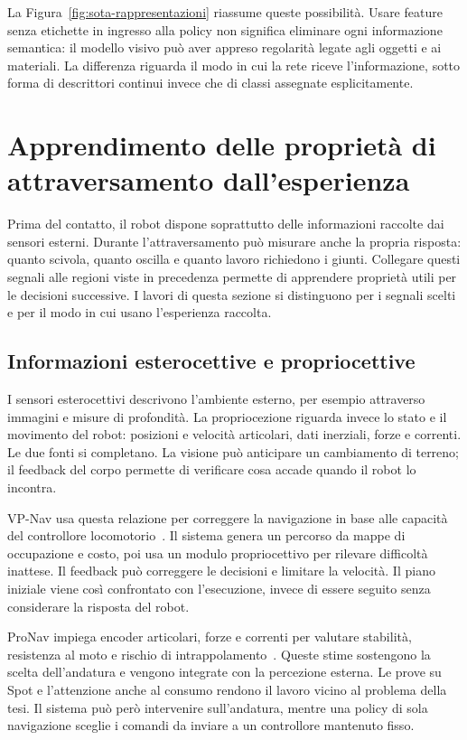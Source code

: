 La Figura~\ref{fig:sota-rappresentazioni} riassume queste possibilità. Usare feature senza etichette in ingresso alla policy non significa eliminare ogni informazione semantica: il modello visivo può aver appreso regolarità legate agli oggetti e ai materiali. La differenza riguarda il modo in cui la rete riceve l'informazione, sotto forma di descrittori continui invece che di classi assegnate esplicitamente.

\section{Apprendimento delle proprietà di attraversamento dall'esperienza}
\label{sec:sota-esperienza}

Prima del contatto, il robot dispone soprattutto delle informazioni raccolte dai sensori esterni. Durante l'attraversamento può misurare anche la propria risposta: quanto scivola, quanto oscilla e quanto lavoro richiedono i giunti. Collegare questi segnali alle regioni viste in precedenza permette di apprendere proprietà utili per le decisioni successive. I lavori di questa sezione si distinguono per i segnali scelti e per il modo in cui usano l'esperienza raccolta.

\subsection{Informazioni esterocettive e propriocettive}

I sensori esterocettivi descrivono l'ambiente esterno, per esempio attraverso immagini e misure di profondità. La propriocezione riguarda invece lo stato e il movimento del robot: posizioni e velocità articolari, dati inerziali, forze e correnti. Le due fonti si completano. La visione può anticipare un cambiamento di terreno; il feedback del corpo permette di verificare cosa accade quando il robot lo incontra.

VP-Nav usa questa relazione per correggere la navigazione in base alle capacità del controllore locomotorio~\citep{Fu2022Coupling}. Il sistema genera un percorso da mappe di occupazione e costo, poi usa un modulo propriocettivo per rilevare difficoltà inattese. Il feedback può correggere le decisioni e limitare la velocità. Il piano iniziale viene così confrontato con l'esecuzione, invece di essere seguito senza considerare la risposta del robot.

ProNav impiega encoder articolari, forze e correnti per valutare stabilità, resistenza al moto e rischio di intrappolamento~\citep{Elnoor2024ProNav}. Queste stime sostengono la scelta dell'andatura e vengono integrate con la percezione esterna. Le prove su Spot e l'attenzione anche al consumo rendono il lavoro vicino al problema della tesi. Il sistema può però intervenire sull'andatura, mentre una policy di sola navigazione sceglie i comandi da inviare a un controllore mantenuto fisso.


